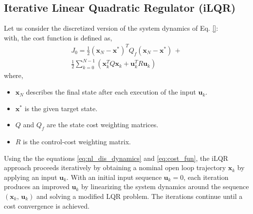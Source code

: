 \documentclass[conference]{IEEEtran}
\newcommand\vx[1]{\mathbf{#1}}
\begin{document}
\subsection{Iterative Linear Quadratic Regulator (iLQR)}\label{subsec:ilqr}


Let us consider the discretized version of the system dynamics of Eq. \eqref{}:
\begin{equation}\label{eq:nl_dis_dynamics}
\end{equation}
with, the cost function is defined as,
\begin{equation}\label{eq:cost_fun}
\begin{split}
J_{0}=\frac{1}{2}\left(\vx{x}_N-\vx{x}^{*}\right)^TQ_{f}(\vx{x}_N-\vx{x}^{*})\,+\\
\frac{1}{2}\sum_{k=0}^{N-1}\left(\vx{x}_{k}^TQ\vx{x}_{k}+\vx{u}_{k}^TR\vx{u}_{k}\right)
\end{split}
\end{equation}
where,
\begin{itemize}
\item{$\vx{x}_N$ describes the final state after each execution of the input $\vx{u}_k$.}
\item{$\vx{x}^{*}$ is the given target state.}
\item{$Q$ and $Q_f$ are the state cost weighting matrices.}
\item{$R$ is the control-cost weighting matrix.}
\end{itemize}
Using the the equations \eqref{eq:nl_dis_dynamics} and \eqref{eq:cost_fun}, the iLQR approach proceeds iteratively by obtaining a nominal open loop trajectory $\vx{x}_k$ by applying an input $\vx{u}_k$. With an initial input sequence $\vx{u}_{k}=0$, each iteration produces an improved $\vx{u}_k$ by linearizing the system dynamics around the sequence $\left(\vx{x}_k,\,\vx{u}_k\right)$ and solving a modified LQR problem. The iterations continue until a cost convergence is achieved.
\end{document}
